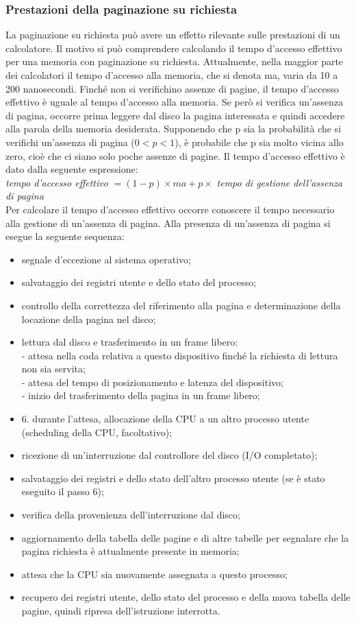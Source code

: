 \documentclass[11pt,a4paper]{article}
\begin{document}
\subsubsection{Prestazioni della paginazione su richiesta}
La paginazione su richiesta può avere un effetto rilevante sulle prestazioni di un calcolatore.
Il motivo si può comprendere calcolando il tempo d'accesso effettivo per una memoria con
paginazione su richiesta. Attualmente, nella maggior parte dei calcolatori il tempo d'accesso
alla memoria, che si denota ma, varia da 10 a 200 nanosecondi. Finché non si verifichino as­senze di pagine, il tempo d'accesso effettivo è uguale al tempo d'accesso alla memoria. Se pe­rò si verifica un'assenza di pagina, occorre prima leggere dal disco la pagina interessata e
quindi accedere alla parola della memoria desiderata.
Supponendo che p sia la probabilità che si verifichi un'assenza di pagina ($0 < p < 1$), è
probabile che p sia molto vicina allo zero, cioè che ci siano solo poche assenze di pagine. Il
tempo d'accesso effettivo è dato dalla seguente espressione:\medskip\\
\emph{tempo d'accesso effettivo} $ = (1 - p) \times ma + p \times$ \emph{tempo di gestione dell'assenza di pagina}\medskip\\
Per calcolare il tempo d'accesso effettivo occorre conoscere il tempo necessario alla gestione
di un'assenza di pagina. Alla presenza di un'assenza di pagina si esegue la seguente sequenza:
\begin{itemize}
\item segnale d'eccezione al sistema operativo;
\item salvataggio dei registri utente e dello stato del processo;
\item controllo della correttezza del riferimento alla pagina e determinazione della locazione della pagina nel disco;
\item lettura dal disco e trasferimento in un frame libero:\\
- attesa nella coda relativa a questo dispositivo finché la richiesta di lettura non sia servita;\\
- attesa del tempo di posizionamento e latenza del dispositivo;\\
- inizio del trasferimento della pagina in un frame libero;
\item 6. durante l'attesa, allocazione della CPU a un altro processo utente (scheduling della
CPU, facoltativo);
\item ricezione di un'interruzione dal controllore del disco (I/O completato);
\item salvataggio dei registri e dello stato dell'altro processo utente (se è stato eseguito il pas­so 6);
\item verifica della provenienza dell'interruzione dal disco;
\item aggiornamento della tabella delle pagine e di altre tabelle per segnalare che la pagina ri­chiesta è attualmente presente in memoria;
\item attesa che la CPU sia nuovamente assegnata a questo processo;
\item recupero dei registri utente, dello stato del processo e della nuova tabella delle pagine, quindi ripresa dell'istruzione interrotta.
\end{itemize}
\end{document}
